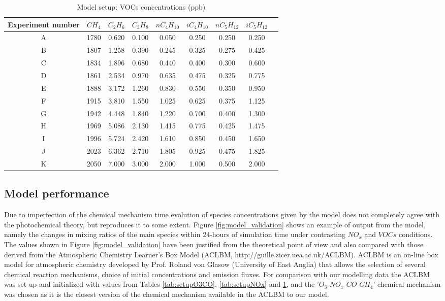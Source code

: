 \documentclass[11pt,a4paper]{article}
\begin{document}
\begin{table} %
\caption{Model setup: VOCs concentrations (ppb)}\label{tab:setupVOCs}
\centering
\begin{tabular}{ccccccccc}
\hline
Experiment number & $CH_4$ & $C_2H_6$ & $C_3H_8$ & $nC_4H_{10}$ & $iC_4H_{10}$ & $nC_5H_{12}$ & $iC_5H_{12}$ \\
\hline
A  & 1780 &	0.620 &	0.100 &	0.050 &	0.250 &	0.250 &	0.250 \\
B  & 1807 &	1.258 &	0.390 &	0.245 &	0.325 &	0.275 &	0.425 \\
C  & 1834 &	1.896 &	0.680 &	0.440 &	0.400 &	0.300 &	0.600 \\
D  & 1861 &	2.534 &	0.970 &	0.635 &	0.475 &	0.325 &	0.775 \\
E  & 1888 &	3.172 &	1.260 &	0.830 &	0.550 &	0.350 &	0.950 \\
F  & 1915 &	3.810 &	1.550 &	1.025 &	0.625 &	0.375 &	1.125 \\
G  & 1942 &	4.448 &	1.840 &	1.220 &	0.700 &	0.400 &	1.300 \\
H  & 1969 &	5.086 &	2.130 &	1.415 &	0.775 &	0.425 &	1.475 \\
I  & 1996 &	5.724 &	2.420 &	1.610 &	0.850 &	0.450 &	1.650 \\
J  & 2023 &	6.362 &	2.710 &	1.805 &	0.925 &	0.475 &	1.825 \\
K  & 2050 &	7.000 &	3.000 &	2.000 &	1.000 &	0.500 &	2.000 \\
\hline
\end{tabular}
\end{table}
\subsection{Model performance}
Due to imperfection of the chemical mechanism time evolution of species concentrations given by the model does not completely agree with the photochemical theory, but reproduces it to some extent. Figure \ref{fig:model_validation} shows an example of output from the model, namely the changes in mixing ratios of the main species within 24-hours of simulation time under contrasting $NO_x$ and $VOCs$ conditions. The values shown in Figure \ref{fig:model_validation} have been justified from the theoretical point of view and also compared with those derived from the Atmospheric Chemistry Learner's Box Model (ACLBM, http://guille.zicer.uea.ac.uk/ACLBM). ACLBM is an on-line box model for atmospheric chemistry developed by Prof. Roland von Glasow (University of East Anglia) that allows the selection of several chemical reaction mechanisms, choice of initial concentrations and emission fluxes. For comparison with our modelling data the ACLBM was set up and initialized with values from Tables \ref{tab:setupO3CO}, \ref{tab:setupNOx} and \ref{tab:setupVOCs}, and the '$O_3$-$NO_x$-$CO$-$CH_4$' chemical mechanism was chosen as it is the closest version of the chemical mechanism available in the ACLBM to our model.
\end{document}
